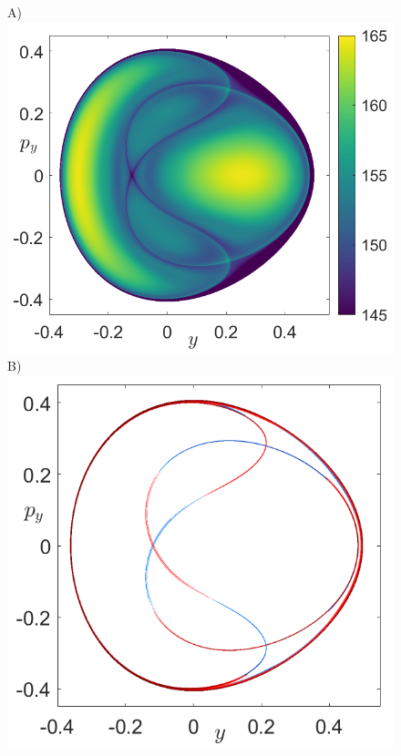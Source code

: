 \documentclass[8pt]{article}
\begin{document}
\begin{figure}[htbp]
	\begin{center}
		A)\includegraphics[scale=0.35]{LDs_Henon_tau_50_x_0_E_1div6.png}
		B)\includegraphics[scale=0.35]{Mani_Henon_tau_50_x_0_E_1div6.png}

\end{center}
\end{figure}
\end{document}
